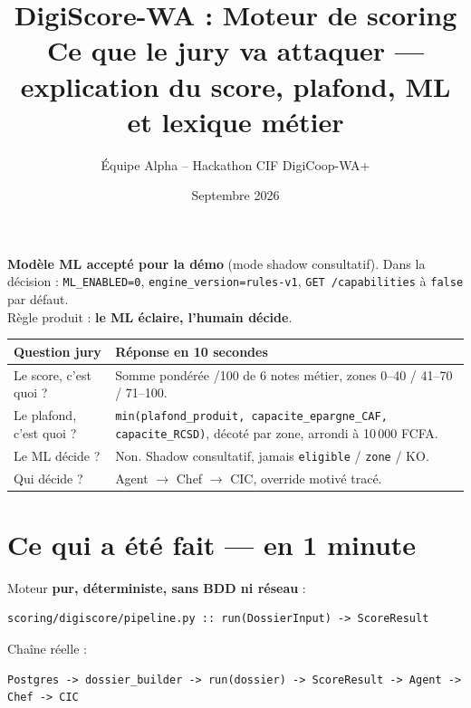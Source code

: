 \documentclass[11pt,a4paper]{article}
\title{{\color{bleujury}DigiScore-WA : Moteur de scoring} \\[0.4em] \large Ce que le jury va attaquer --- explication du score, plafond, ML et lexique métier}
\author{Équipe Alpha -- Hackathon CIF DigiCoop-WA+}
\date{Septembre 2026}
\newcommand{\C}[1]{{\small\texttt{\nolinkurl{#1}}}}
\begin{document}
\maketitle

\begin{encadrebleu}
\centering \textbf{Modèle ML accepté pour la démo} (mode shadow consultatif). Dans la décision : \C{ML\_ENABLED=0}, \C{engine\_version=rules-v1}, \C{GET /capabilities} à \C{false} par défaut. \\[0.3em]
Règle produit : \textbf{le ML éclaire, l'humain décide}.
\end{encadrebleu}

\vspace{0.4em}
\begin{center}
\begin{tabularx}{\linewidth}{lX}
\toprule
\textbf{Question jury} & \textbf{Réponse en 10 secondes} \\
\midrule
Le score, c'est quoi ? & Somme pondérée /100 de 6 notes métier, zones 0--40 / 41--70 / 71--100. \\
Le plafond, c'est quoi ? & \C{min(plafond\_produit, capacite\_epargne\_CAF, capacite\_RCSD)}, décoté par zone, arrondi à 10\,000 FCFA. \\
Le ML décide ? & Non. Shadow consultatif, jamais \C{eligible} / \C{zone} / KO. \\
Qui décide ? & Agent $\rightarrow$ Chef $\rightarrow$ CIC, override motivé tracé. \\
\bottomrule
\end{tabularx}
\end{center}

{\small
\tableofcontents
}
\newpage

\section{Ce qui a été fait --- en 1 minute}

Moteur \textbf{pur, déterministe, sans BDD ni réseau} :
\begin{lstlisting}
scoring/digiscore/pipeline.py :: run(DossierInput) -> ScoreResult
\end{lstlisting}

Chaîne réelle :
\begin{lstlisting}
Postgres -> dossier_builder -> run(dossier) -> ScoreResult -> Agent -> Chef -> CIC
\end{lstlisting}
\end{document}
